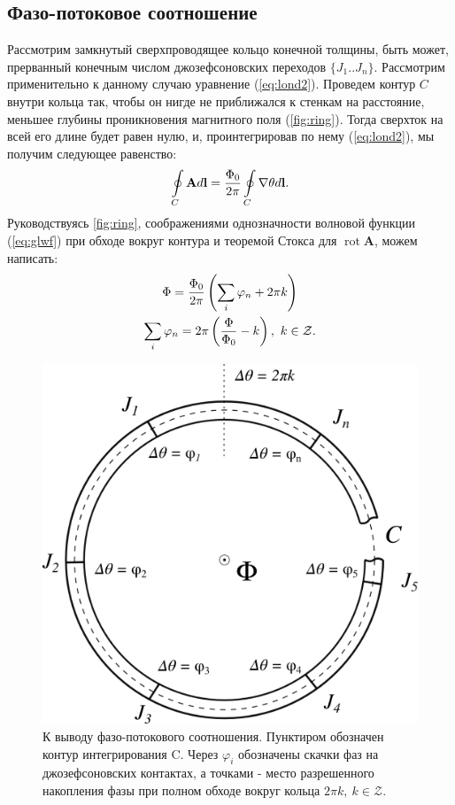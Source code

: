 \documentclass[12pt]{article}
\numberwithin{equation}{section}
\begin{document}
\subsection{Фазо-потоковое соотношение}
Рассмотрим замкнутый сверхпроводящее кольцо конечной толщины, быть может, прерванный конечным числом джозефсоновских переходов $\{J_1..J_n\}$. Рассмотрим применительно к данному случаю уравнение (\ref{eq:lond2}). Проведем контур $C$ внутри кольца так, чтобы он нигде не приближался к стенкам на расстояние, меньшее глубины проникновения магнитного поля (\autoref{fig:ring}). Тогда сверхток на всей его длине будет равен нулю, и, проинтегрировав по нему (\ref{eq:lond2}), мы получим следующее равенство:
\begin{equation}
\oint\displaylimits_C \mathbf{A}d\mathbf{l} = \frac{\Phi_0}{2\pi}\oint\displaylimits_C \nabla \theta d \mathbf{l} \notag.
\end{equation}
Руководствуясь \autoref{fig:ring}, соображениями однозначности волновой функции (\ref{eq:glwf}) при обходе вокруг контура и теоремой Стокса для $\operatorname{rot} \mathbf{A}$, можем написать:
\begin{gather}
\Phi = \frac{\Phi_0}{2\pi}\left(\sum_i \varphi_n + 2\pi k\right) \notag \\
\sum_i \varphi_n = 2\pi\left(\frac{\Phi}{\Phi_0} - k\right),\ k\in \mathcal{Z}.
\label{eq:phsflx}
\end{gather}

\begin{figure}[h]
\centering
\includegraphics[width=0.5\linewidth]{Pictures/ring.png}
\caption{К выводу фазо-потокового соотношения. Пунктиром обозначен контур интегрирования C. Через $\varphi_i$ обозначены скачки фаз на джозефсоновских контактах, а точками - место разрешенного накопления фазы при полном обходе вокруг кольца $2\pi k,\ k\in\mathcal{Z}$.}
\label{fig:ring}
\end{figure}
\end{document}
